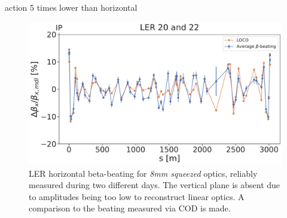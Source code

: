 action 5 times lower than horizontal

\begin{figure}[!htb]
    \centering
    \includegraphics[width=0.7\linewidth]{images/kek/ler_20_22_bet_x.pdf}
    \caption{LER horizontal beta-beating for \textit{8mm squeezed} optics, reliably measured during
    two different days. The vertical plane is absent due to amplitudes being too low to reconstruct
    linear optics. A comparison to the beating measured via COD is made.}
    \label{fig:kek:beating_ler_squeezed}
\end{figure}



\FloatBarrier
\subsubsection{}


